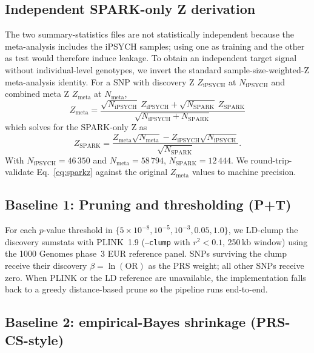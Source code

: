 \subsection{Independent SPARK-only Z derivation}
\label{sec:sparkz}

The two summary-statistics files are not statistically independent
because the meta-analysis includes the iPSYCH samples; using one as
training and the other as test would therefore induce leakage. To obtain
an independent target signal without individual-level genotypes, we
invert the standard sample-size-weighted-Z meta-analysis identity. For a
SNP with discovery Z $Z_{\mathrm{iPSYCH}}$ at $N_{\mathrm{iPSYCH}}$ and
combined meta Z $Z_{\mathrm{meta}}$ at $N_{\mathrm{meta}}$,
\begin{equation}
  Z_{\mathrm{meta}}
  = \frac{\sqrt{N_{\mathrm{iPSYCH}}}\, Z_{\mathrm{iPSYCH}}
        + \sqrt{N_{\mathrm{SPARK}}}\, Z_{\mathrm{SPARK}}}
         {\sqrt{N_{\mathrm{iPSYCH}} + N_{\mathrm{SPARK}}}}
\end{equation}
which solves for the SPARK-only Z as
\begin{equation}
  Z_{\mathrm{SPARK}}
  = \frac{Z_{\mathrm{meta}}\sqrt{N_{\mathrm{meta}}}
        - Z_{\mathrm{iPSYCH}}\sqrt{N_{\mathrm{iPSYCH}}}}
         {\sqrt{N_{\mathrm{SPARK}}}}.
  \label{eq:sparkz}
\end{equation}
With $N_{\mathrm{iPSYCH}} = 46\,350$ and $N_{\mathrm{meta}} = 58\,794$,
$N_{\mathrm{SPARK}} = 12\,444$. We round-trip-validate
Eq.~\ref{eq:sparkz} against the original $Z_{\mathrm{meta}}$ values to
machine precision.

\subsection{Baseline 1: Pruning and thresholding (P+T)}

For each $p$-value threshold in $\{5\!\times\!10^{-8}, 10^{-5}, 10^{-3},
0.05, 1.0\}$, we LD-clump the discovery sumstats with PLINK~1.9
(\texttt{--clump} with $r^2 < 0.1$, 250\,kb window) using the 1000
Genomes phase~3 EUR reference panel. SNPs surviving the clump receive
their discovery $\beta = \ln(\mathrm{OR})$ as the PRS weight; all other
SNPs receive zero. When PLINK or the LD reference are unavailable, the
implementation falls back to a greedy distance-based prune so the
pipeline runs end-to-end.

\subsection{Baseline 2: empirical-Bayes shrinkage (PRS-CS-style)}

